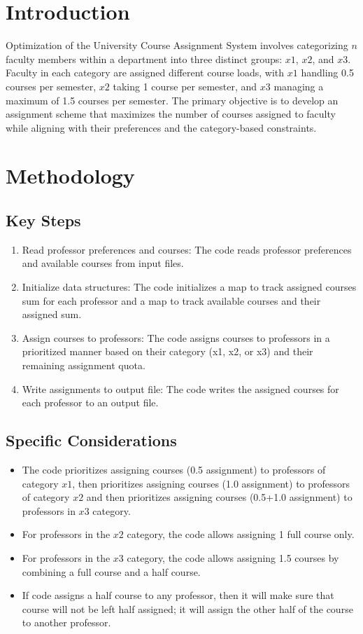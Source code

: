 \documentclass{article}
\begin{document}
\section*{Introduction}
Optimization of the University Course Assignment System involves categorizing \(n\) faculty members within a department into three distinct groups: \(x1\), \(x2\), and \(x3\). Faculty in each category are assigned different course loads, with \(x1\) handling 0.5 courses per semester, \(x2\) taking 1 course per semester, and \(x3\) managing a maximum of 1.5 courses per semester. The primary objective is to develop an assignment scheme that maximizes the number of courses assigned to faculty while aligning with their preferences and the category-based constraints.

\section*{Methodology}
\subsection*{Key Steps}
\begin{enumerate}
  \item Read professor preferences and courses: The code reads professor preferences and available courses from input files.
  \item Initialize data structures: The code initializes a map to track assigned courses sum for each professor and a map to track available courses and their assigned sum.
  \item Assign courses to professors: The code assigns courses to professors in a prioritized manner based on their category (x1, x2, or x3) and their remaining assignment quota.
  \item Write assignments to output file: The code writes the assigned courses for each professor to an output file.
\end{enumerate}

\subsection*{Specific Considerations}
\begin{itemize}
  \item The code prioritizes assigning courses (0.5 assignment) to professors of category \(x1\), then prioritizes assigning courses (1.0 assignment) to professors of category \(x2\) and then prioritizes assigning courses (0.5+1.0 assignment) to professors in \(x3\) category.
  \item For professors in the \(x2\) category, the code allows assigning 1 full course only.
  \item For professors in the \(x3\) category, the code allows assigning 1.5 courses by combining a full course and a half course.
  \item If code assigns a half course to any professor, then it will make sure that course will not be left half assigned; it will assign the other half of the course to another professor.
\end{itemize}
\end{document}
